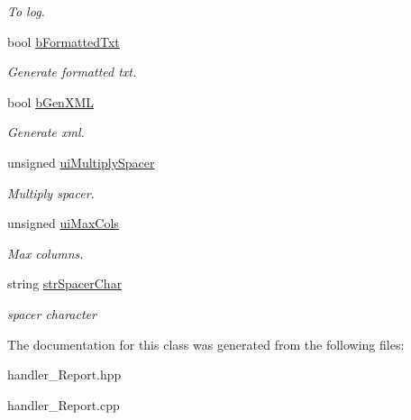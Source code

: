 \begin{DoxyCompactItemize}
\begin{DoxyCompactList}\small\item\em To log. \item\end{DoxyCompactList}\item 
\hypertarget{classhandler__Report_a01b617c244828e8b335d340c7100cda9}{
bool \hyperlink{classhandler__Report_a01b617c244828e8b335d340c7100cda9}{bFormattedTxt}}
\label{classhandler__Report_a01b617c244828e8b335d340c7100cda9}

\begin{DoxyCompactList}\small\item\em Generate formatted txt. \item\end{DoxyCompactList}\item 
\hypertarget{classhandler__Report_af4d0a63e01b33543e5c99f506e26b501}{
bool \hyperlink{classhandler__Report_af4d0a63e01b33543e5c99f506e26b501}{bGenXML}}
\label{classhandler__Report_af4d0a63e01b33543e5c99f506e26b501}

\begin{DoxyCompactList}\small\item\em Generate xml. \item\end{DoxyCompactList}\item 
\hypertarget{classhandler__Report_a4c432f8d94b302551fc555c5ecc38be3}{
unsigned \hyperlink{classhandler__Report_a4c432f8d94b302551fc555c5ecc38be3}{uiMultiplySpacer}}
\label{classhandler__Report_a4c432f8d94b302551fc555c5ecc38be3}

\begin{DoxyCompactList}\small\item\em Multiply spacer. \item\end{DoxyCompactList}\item 
\hypertarget{classhandler__Report_abe60637871a948045fc0c8a9bf55a096}{
unsigned \hyperlink{classhandler__Report_abe60637871a948045fc0c8a9bf55a096}{uiMaxCols}}
\label{classhandler__Report_abe60637871a948045fc0c8a9bf55a096}

\begin{DoxyCompactList}\small\item\em Max columns. \item\end{DoxyCompactList}\item 
\hypertarget{classhandler__Report_a3ab81c5a6cdd06611c7e2e6d2d2424e3}{
string \hyperlink{classhandler__Report_a3ab81c5a6cdd06611c7e2e6d2d2424e3}{strSpacerChar}}
\label{classhandler__Report_a3ab81c5a6cdd06611c7e2e6d2d2424e3}

\begin{DoxyCompactList}\small\item\em spacer character \item\end{DoxyCompactList}\end{DoxyCompactItemize}


The documentation for this class was generated from the following files:\begin{DoxyCompactItemize}
\item 
handler\_\-Report.hpp\item 
handler\_\-Report.cpp\end{DoxyCompactItemize}
